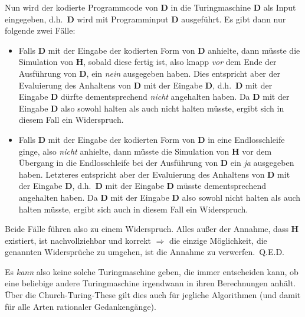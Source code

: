 \noindent Nun wird der kodierte Programmcode von $\mathbf{D}$ in die Turingmaschine $\mathbf{D}$ als Input eingegeben, d.h.\ $\mathbf{D}$ wird mit Programminput $\mathbf{D}$ ausgeführt. Es gibt dann nur folgende zwei Fälle:

\begin{itemize}
  \item Falls $\mathbf{D}$ mit der Eingabe der kodierten Form von $\mathbf{D}$ anhielte, dann müsste die Simulation von $\mathbf{H}$, sobald diese fertig ist, also knapp \emph{vor} dem Ende der Ausführung von $\mathbf{D}$, ein \emph{nein} ausgegeben haben. Dies entspricht aber der Evaluierung des Anhaltens von $\mathbf{D}$ mit der Eingabe $\mathbf{D}$, d.h.\ $\mathbf{D}$ mit der Eingabe $\mathbf{D}$ dürfte dementsprechend \emph{nicht} angehalten haben. Da $\mathbf{D}$ mit der Eingabe $\mathbf{D}$ also sowohl halten als auch nicht halten müsste, ergibt sich in diesem Fall ein Widerspruch.
  \item Falls $\mathbf{D}$ mit der Eingabe der kodierten Form von $\mathbf{D}$ in eine Endlosschleife ginge, also \emph{nicht} anhielte, dann müsste die Simulation von $\mathbf{H}$ vor dem Übergang in die Endlos\-schleife bei der Ausführung von $\mathbf{D}$ ein \emph{ja} ausgegeben haben. Letzteres entspricht aber der Evaluierung des Anhaltens von $\mathbf{D}$ mit der Eingabe $\mathbf{D}$, d.h.\ $\mathbf{D}$ mit der Eingabe $\mathbf{D}$ müsste dementsprechend angehalten haben. Da $\mathbf{D}$ mit der Eingabe $\mathbf{D}$ also sowohl nicht halten als auch halten müsste, ergibt sich auch in diesem Fall ein Widerspruch.
\end{itemize}

\noindent Beide Fälle führen also zu einem Widerspruch. Alles außer der Annahme, dass $\mathbf{H}$ existiert, ist nachvollziehbar und korrekt $\Rightarrow$ die einzige Möglichkeit, die genannten Widersprüche zu umgehen, ist die Annahme zu verwerfen.~Q.E.D.\newline

\noindent Es \emph{kann} also keine solche Turingmaschine geben, die immer entscheiden kann, ob eine beliebige andere Turingmaschine irgendwann in ihren Berechnungen anhält. Über die Church-Turing-These gilt dies auch für jegliche Algorithmen (und damit für alle Arten rationaler Gedankengänge).


